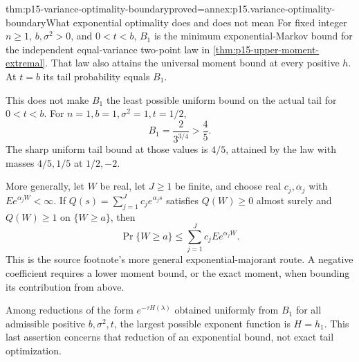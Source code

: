 \begin{hbtheorem}{thm:p15-variance-optimality-boundary}{proved=annex:p15.variance-optimality-boundary}{What exponential optimality does and does not mean}
For fixed integer \(n\geq1\), \(b,\sigma^2>0\), and \(0<t<b\),
\(B_1\) is the minimum exponential-Markov
bound for the independent equal-variance two-point law in
\cref{thm:p15-upper-moment-extremal}. That law also attains the universal
moment bound at every positive \(h\). At \(t=b\) its tail probability
equals \(B_1\).

This does not make \(B_1\) the least possible uniform bound on the actual
tail for \(0<t<b\). For \(n=1,b=1,\sigma^2=1,t=1/2\),
\[
 B_1=\frac{2}{3^{3/4}}>\frac45.
\]
The sharp uniform tail bound at those values is \(4/5\), attained by
the law with masses \(4/5,1/5\) at \(1/2,-2\).

More generally, let \(W\) be real, let \(J\geq1\) be finite, and choose
real \(c_j,\alpha_j\) with \(Ee^{\alpha_jW}<\infty\).
If \(Q(s)=\sum_{j=1}^Jc_je^{\alpha_js}\) satisfies
\(Q(W)\geq0\) almost surely and \(Q(W)\geq1\) on \(\{W\geq a\}\),
then
\[
 \Pr\{W\geq a\}\leq\sum_{j=1}^Jc_jEe^{\alpha_jW}.
\]
This is the source footnote's more general exponential-majorant route.
A negative coefficient requires a lower moment bound, or the exact
moment, when bounding its contribution from above.

Among reductions of the form \(e^{-\tau H(\lambda)}\) obtained uniformly
from \(B_1\) for all admissible positive \(b,\sigma^2,t\), the largest
possible exponent function is \(H=h_1\). This last assertion concerns
that reduction of an exponential bound, not exact tail optimization.
\end{hbtheorem}

